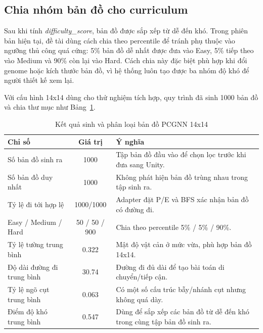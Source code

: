 \subsection{Chia nhóm bản đồ cho curriculum}

Sau khi tính \emph{difficulty\_score}, bản đồ được sắp xếp từ dễ đến khó. Trong phiên bản hiện tại, đề tài dùng cách chia theo percentile để tránh phụ thuộc vào ngưỡng thủ công quá cứng: 5\% bản đồ dễ nhất được đưa vào Easy, 5\% tiếp theo vào Medium và 90\% còn lại vào Hard. Cách chia này đặc biệt phù hợp khi đổi genome hoặc kích thước bản đồ, vì hệ thống luôn tạo được ba nhóm độ khó để người thiết kế xem lại.

Với cấu hình 14x14 dùng cho thử nghiệm tích hợp, quy trình đã sinh 1000 bản đồ và chia thư mục như Bảng~\ref{tab:pcgnn_map_generation_summary}.

\begin{table}[H]
    \centering
    \small
    \caption{Kết quả sinh và phân loại bản đồ PCGNN 14x14}
    \label{tab:pcgnn_map_generation_summary}
    \begin{tabular}{|p{5cm}|c|p{6.7cm}|}
        \hline
        \textbf{Chỉ số} & \textbf{Giá trị} & \textbf{Ý nghĩa} \\
        \hline
        Số bản đồ sinh ra & 1000 & Tập bản đồ đầu vào để chọn lọc trước khi đưa sang Unity. \\
        \hline
        Số bản đồ duy nhất & 1000 & Không phát hiện bản đồ trùng nhau trong tập sinh ra. \\
        \hline
        Tỷ lệ đi tới hợp lệ & 1000/1000 & Adapter đặt P/E và BFS xác nhận bản đồ có đường đi. \\
        \hline
        Easy / Medium / Hard & 50 / 50 / 900 & Chia theo percentile 5\% / 5\% / 90\%. \\
        \hline
        Tỷ lệ tường trung bình & 0.322 & Mật độ vật cản ở mức vừa, phù hợp bản đồ 14x14. \\
        \hline
        Độ dài đường đi trung bình & 30.74 & Đường đi đủ dài để tạo bài toán di chuyển/tiếp cận. \\
        \hline
        Tỷ lệ ngõ cụt trung bình & 0.063 & Có một số cấu trúc bẫy/nhánh cụt nhưng không quá dày. \\
        \hline
        Điểm độ khó trung bình & 0.547 & Dùng để sắp xếp các bản đồ từ dễ đến khó trong cùng tập bản đồ sinh ra. \\
        \hline
    \end{tabular}
\end{table}

